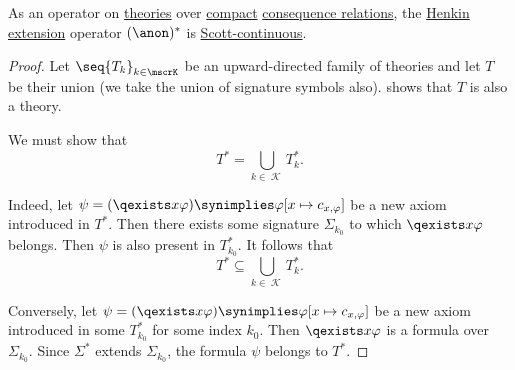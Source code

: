 \begin{lemma}\label{thm:fol_henkin_extensions_scott_continuous}
  As an operator on \hyperref[def:fol_theory]{theories} over \hyperref[def:consequence_relation/compactness]{compact} \hyperref[def:consequence_relation]{consequence relations}, the \hyperref[def:fol_henkin_extension]{Henkin extension} operator \( (\anon)^* \) is \hyperref[def:scott_continuity]{Scott-continuous}.
\end{lemma}
\begin{proof}
  Let \( \seq{ T_k }_{k \in \mscrK} \) be an upward-directed family of theories and let \( T \) be their union (we take the union of signature symbols also).  shows that \( T \) is also a theory.

  We must show that
  \begin{equation*}
    T^* = \bigcup_{k \in \mscrK} T_k^*.
  \end{equation*}

  Indeed, let \( \psi = (\qexists x \varphi) \synimplies \varphi[x \mapsto c_{x,\varphi}] \) be a new axiom introduced in \( T^* \). Then there exists some signature \( \Sigma_{k_0} \) to which \( \qexists x \varphi \) belongs. Then \( \psi \) is also present in \( T_{k_0}^* \). It follows that
  \begin{equation*}
    T^* \subseteq \bigcup_{k \in \mscrK} T_k^*.
  \end{equation*}

  Conversely, let \( \psi = (\qexists x \varphi) \synimplies \varphi[x \mapsto c_{x,\varphi}] \) be a new axiom introduced in some \( T_{k_0}^* \) for some index \( k_0 \). Then \( \qexists x \varphi \) is a formula over \( \Sigma_{k_0} \). Since \( \Sigma^* \) extends \( \Sigma_{k_0} \), the formula \( \psi \) belongs to \( T^* \).
\end{proof}

